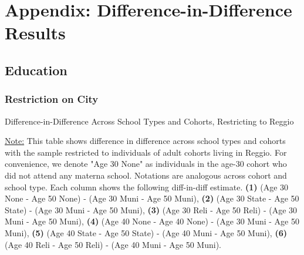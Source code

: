 \documentclass[11pt]{article}
\begin{document}
\appendix

\section{Appendix: Difference-in-Difference Results}
\subsection{Education}

\subsubsection{Restriction on City}
\begin{table}[H] 
\begin{center}
	\caption{Difference-in-Difference Across School Types and Cohorts, Restricting to Reggio} \label{table:EC-Reggio}
	\scalebox{0.80}{
		}
\end{center}
\footnotesize
\underline{Note:} This table shows difference in difference across school types and cohorts with the sample restricted to individuals of adult cohorts living in Reggio. For convenience, we denote "Age 30 None" as individuals in the age-30 cohort who did not attend any materna school. Notations are analogous across cohort and school type. Each column shows the following diff-in-diff estimate. \textbf{(1)} (Age 30 None - Age 50 None) - (Age 30 Muni - Age 50 Muni), \textbf{(2)} (Age 30 State - Age 50 State) - (Age 30 Muni - Age 50 Muni), \textbf{(3)} (Age 30 Reli - Age 50 Reli) - (Age 30 Muni - Age 50 Muni), \textbf{(4)} (Age 40 None - Age 40 None) - (Age 30 Muni - Age 50 Muni),  \textbf{(5)} (Age 40 State - Age 50 State) - (Age 40 Muni - Age 50 Muni), \textbf{(6)} (Age 40 Reli - Age 50 Reli) - (Age 40 Muni - Age 50 Muni). 
\end{table}
\end{document}
